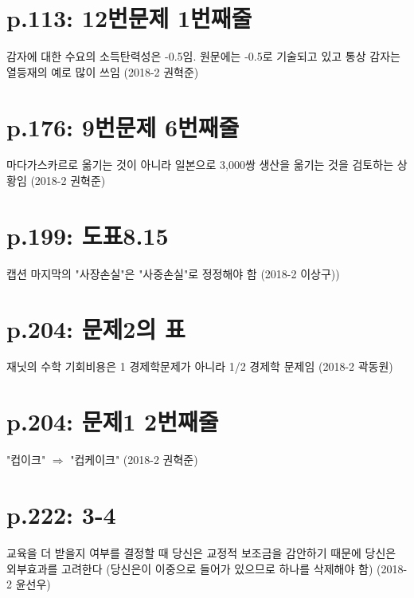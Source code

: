 \documentclass[a4paper]{article}
\begin{document}
\section{p.113: 12번문제 1번째줄} %
\label{sec:p_113_12}
감자에 대한 수요의 소득탄력성은 -0.5임. 원문에는 -0.5로 기술되고 있고 통상 감자는 열등재의 예로 많이 쓰임 (2018-2 권혁준)

\section{p.176: 9번문제 6번째줄} %
\label{sec:p_176_9}
마다가스카르로 옮기는 것이 아니라 일본으로 3,000쌍 생산을 옮기는 것을 검토하는 상황임 (2018-2 권혁준)

\section{p.199: 도표8.15} %
\label{sec:p_199_}
캡션 마지막의 "사장손실"은 "사중손실"로 정정해야 함 (2018-2 이상구))

\section{p.204: 문제2의 표} %
\label{sec:p_204_}
재닛의 수학 기회비용은 1 경제학문제가 아니라 1/2 경제학 문제임
(2018-2 곽동원)

\section{p.204: 문제1 2번째줄} %
\label{sec:p_204}
"컵이크" $\Rightarrow$ "컵케이크" (2018-2 권혁준)

\section{p.222: 3-4} %
\label{sec:p_222_3_4}
교육을 더 받을지 여부를 결정할 때 당신은 교정적 보조금을 감안하기 때문에 당신은 외부효과를 고려한다 (당신은이 이중으로 들어가 있으므로 하나를 삭제해야 함) (2018-2 윤선우)
\end{document}
